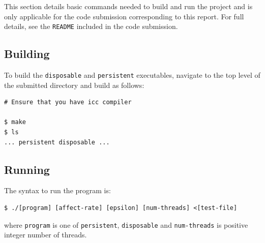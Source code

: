 \documentclass{article}
\begin{document}
This section details basic commands needed to build and run the project and is
only applicable for the code submission corresponding to this report. For full
details, see the \texttt{README} included in the code submission.

\subsection*{Building}
\label{subsec:building}

To build the \texttt{disposable} and \texttt{persistent} executables, navigate
to the top level of the submitted directory and build as follows:

\begin{lstlisting}[style=DOS]
# Ensure that you have icc compiler

$ make
$ ls
... persistent disposable ...
\end{lstlisting}

\subsection*{Running}
\label{subsec:running}

The syntax to run the program is:

\begin{lstlisting}[style=DOS]
$ ./[program] [affect-rate] [epsilon] [num-threads] <[test-file]
\end{lstlisting}
where \texttt{program} is one of \texttt{persistent}, \texttt{disposable}
and \texttt{num-threads} is positive integer number of threads.
\end{document}
